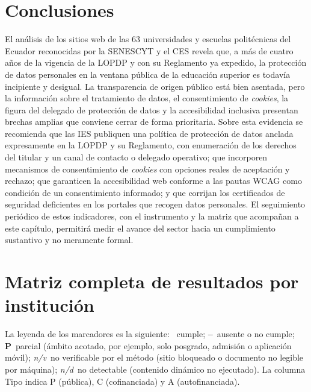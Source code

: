 \documentclass[11pt,a4paper]{article}
\newcommand{\si}{\ding{51}}                 %
\newcommand{\no}{\textcolor{gris}{\textbf{--}}} %
\newcommand{\nv}{\textsl{\footnotesize n/v}}%
\newcommand{\nd}{\textsl{\footnotesize n/d}}%
\begin{document}
\section{Conclusiones}
El an\'alisis de los sitios web de las 63 universidades y escuelas polit\'ecnicas del Ecuador reconocidas por la SENESCYT y el CES revela que, a m\'as de cuatro a\~nos de la vigencia de la LOPDP y con su Reglamento ya expedido, la protecci\'on de datos personales en la ventana p\'ublica de la educaci\'on superior es todav\'ia incipiente y desigual.
La transparencia de origen p\'ublico est\'a bien asentada, pero la informaci\'on sobre el tratamiento de datos, el consentimiento de \emph{cookies}, la figura del delegado de protecci\'on de datos y la accesibilidad inclusiva presentan brechas amplias que conviene cerrar de forma prioritaria.
Sobre esta evidencia se recomienda que las IES publiquen una pol\'itica de protecci\'on de datos anclada expresamente en la LOPDP y su Reglamento, con enumeraci\'on de los derechos del titular y un canal de contacto o delegado operativo; que incorporen mecanismos de consentimiento de \emph{cookies} con opciones reales de aceptaci\'on y rechazo; que garanticen la accesibilidad web conforme a las pautas WCAG como condici\'on de un consentimiento informado; y que corrijan los certificados de seguridad deficientes en los portales que recogen datos personales.
El seguimiento peri\'odico de estos indicadores, con el instrumento y la matriz que acompa\~nan a este cap\'itulo, permitir\'a medir el avance del sector hacia un cumplimiento sustantivo y no meramente formal.

\appendix
\section{Matriz completa de resultados por instituci\'on}
\label{ap:matriz}
La leyenda de los marcadores es la siguiente: \si~cumple; \no~ausente o no cumple; \textbf{P}~parcial (\'ambito acotado, por ejemplo, solo posgrado, admisi\'on o aplicaci\'on m\'ovil); \nv~no verificable por el m\'etodo (sitio bloqueado o documento no legible por m\'aquina); \nd~no detectable (contenido din\'amico no ejecutado). La columna Tipo indica P (p\'ublica), C (cofinanciada) y A (autofinanciada).
\end{document}
